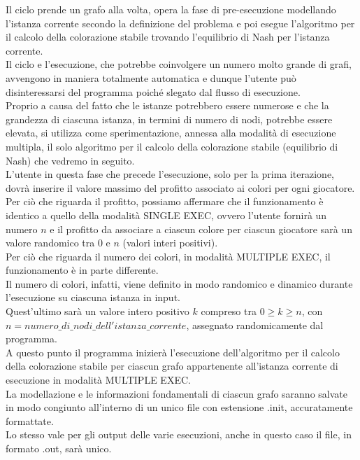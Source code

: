 Il ciclo prende un grafo alla volta, opera la fase di pre-esecuzione modellando l'istanza corrente secondo la definizione del problema e poi esegue l'algoritmo per il calcolo della colorazione stabile trovando l'equilibrio di Nash per l'istanza corrente.\\
Il ciclo e l'esecuzione, che potrebbe coinvolgere un numero molto grande di grafi, avvengono in maniera totalmente automatica e dunque l'utente può disinteressarsi del programma poiché slegato dal flusso di esecuzione.\\

Proprio a causa del fatto che le istanze potrebbero essere numerose e che la grandezza di ciascuna istanza, in termini di numero di nodi, potrebbe essere elevata, si utilizza come sperimentazione, annessa alla modalità di esecuzione multipla, il solo algoritmo per il calcolo della colorazione stabile (equilibrio di Nash) che vedremo in seguito.\\

L'utente in questa fase che precede l'esecuzione, solo per la prima iterazione, dovrà inserire il valore massimo del profitto associato ai colori per ogni giocatore.\\

Per ciò che riguarda il profitto, possiamo affermare che il funzionamento è identico a quello della modalità SINGLE EXEC, ovvero l'utente fornirà un numero \(n\) e il profitto da associare a ciascun colore per ciascun giocatore sarà un valore randomico tra $0$ e \(n\) (valori interi positivi).\\

Per ciò che riguarda il numero dei colori, in modalità MULTIPLE EXEC, il funzionamento è in parte differente.\\
Il numero di colori, infatti, viene definito in modo randomico e dinamico durante l'esecuzione su ciascuna istanza in input.\\
Quest'ultimo sarà un valore intero positivo \(k\) compreso tra \(0 \geq k \geq n\), con \(n = numero\_di\_nodi\_dell'istanza\_corrente\), assegnato randomicamente dal programma.\\

A questo punto il programma inizierà l'esecuzione dell'algoritmo per il calcolo della colorazione stabile per ciascun grafo appartenente all'istanza corrente di esecuzione in modalità MULTIPLE EXEC.\\
La modellazione e le informazioni fondamentali di ciascun grafo saranno salvate in modo congiunto all'interno di un unico file con estensione .init, accuratamente formattate.\\
Lo stesso vale per gli output delle varie esecuzioni, anche in questo caso il file, in formato .out, sarà unico.\\

